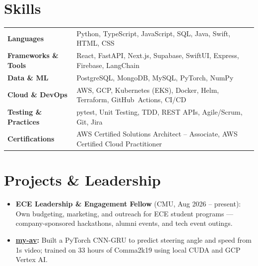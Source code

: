 \documentclass[11pt, letterpaper]{article}
\begin{document}
\section{Skills}
\begin{tabularx}{\textwidth}{@{}l @{\hspace{7pt}} >{\raggedright\arraybackslash}X@{}}
  \textbf{Languages} & Python, TypeScript, JavaScript, SQL, Java, Swift, HTML, CSS \\[1pt]
  \textbf{Frameworks \& Tools} & React, FastAPI, Next.js, Supabase, SwiftUI, Express, Firebase, LangChain \\[1pt]
  \textbf{Data \& ML} & PostgreSQL, MongoDB, MySQL, PyTorch, NumPy \\[1pt]
  \textbf{Cloud \& DevOps} & AWS, GCP, Kubernetes (EKS), Docker, Helm, Terraform, GitHub~Actions, CI/CD \\[1pt]
  \textbf{Testing \& Practices} & pytest, Unit Testing, TDD, REST APIs, Agile/Scrum, Git, Jira \\[1pt]
  \textbf{Certifications} & AWS Certified Solutions Architect -- Associate, AWS Certified Cloud Practitioner \\
\end{tabularx}

\section{Projects \& Leadership}
\begin{itemize}
  \item \textbf{ECE Leadership \& Engagement Fellow} (CMU, Aug 2026 -- present): Own budgeting, marketing, and outreach for ECE student programs --- company-sponsored hackathons, alumni events, and tech event outings.
  \item \textbf{\href{https://github.com/lordphone/my-av}{my-av}:} Built a PyTorch CNN-GRU to predict steering angle and speed from 1s video; trained on 33 hours of Comma2k19 using local CUDA and GCP Vertex AI.
\end{itemize}
\end{document}
